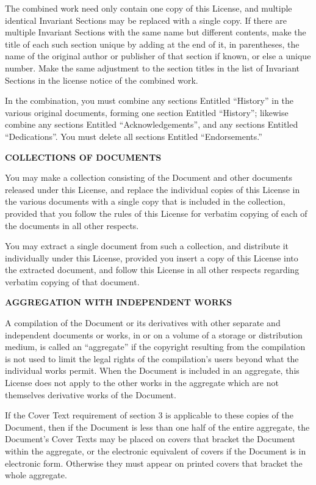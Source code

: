 The combined work need only contain one copy of this License, and multiple identical Invariant Sections may be replaced with a single copy.  If there are multiple Invariant Sections with the same name but different contents, make the title of each such section unique by adding at the end of it, in parentheses, the name of the original author or publisher of that section if known, or else a unique number. Make the same adjustment to the section titles in the list of Invariant Sections in the license notice of the combined work.

In the combination, you must combine any sections Entitled ``History'' in the various original documents, forming one section Entitled ``History''; likewise combine any sections Entitled ``Acknowledgements'', and any sections Entitled ``Dedications''.  You must delete all sections Entitled ``Endorsements.''

\item
{\bf COLLECTIONS OF DOCUMENTS}

You may make a collection consisting of the Document and other documents released under this License, and replace the individual copies of this License in the various documents with a single copy that is included in the collection, provided that you follow the rules of this License for verbatim copying of each of the documents in all other respects.

You may extract a single document from such a collection, and distribute it individually under this License, provided you insert a copy of this License into the extracted document, and follow this License in all other respects regarding verbatim copying of that document.

\item
{\bf AGGREGATION WITH INDEPENDENT WORKS}

A compilation of the Document or its derivatives with other separate and independent documents or works, in or on a volume of a storage or distribution medium, is called an ``aggregate'' if the copyright resulting from the compilation is not used to limit the legal rights of the compilation's users beyond what the individual works permit. When the Document is included in an aggregate, this License does not apply to the other works in the aggregate which are not themselves derivative works of the Document.

If the Cover Text requirement of section 3 is applicable to these copies of the Document, then if the Document is less than one half of the entire aggregate, the Document's Cover Texts may be placed on covers that bracket the Document within the aggregate, or the electronic equivalent of covers if the Document is in electronic form. Otherwise they must appear on printed covers that bracket the whole aggregate.

